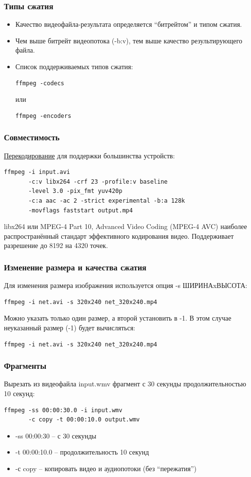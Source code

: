 \documentclass[11pt, compress]{beamer}
\renewcommand{\emph}[1]{\textcolor{dark-blue}{#1}}
\begin{document}
\begin{frame}[c,fragile]
\frametitle{Типы сжатия}
\begin{itemize}
\item Качество видеофайла-результата определяется ``битрейтом'' и типом сжатия.
\item Чем выше битрейт видеопотока (\emph{-b:v}), тем выше качество результирующего файла.
\item Список поддерживаемых типов сжатия:
\begin{lstlisting}
ffmpeg -codecs
\end{lstlisting}  
или
\begin{lstlisting}
ffmpeg -encoders
\end{lstlisting}  
\end{itemize}
\end{frame}

\begin{frame}[c,fragile]
\frametitle{Совместимость}
\href{https://superuser.com/questions/859010/what-ffmpeg-command-line-produces-video-more-compatible-across-all-devices}{Перекодирование} для поддержки большинства устройств:
\begin{lstlisting}
ffmpeg -i input.avi 
       -c:v libx264 -crf 23 -profile:v baseline 
       -level 3.0 -pix_fmt yuv420p 
       -c:a aac -ac 2 -strict experimental -b:a 128k 
       -movflags faststart output.mp4
\end{lstlisting}
\emph{libx264} или MPEG-4 Part 10, Advanced Video Coding (MPEG-4 AVC) наиболее распространённый стандарт эффективного кодирования видео. Поддерживает разрешение до 8192 на 4320 точек.
\end{frame}


\begin{frame}[c, fragile]
\frametitle{Изменение размера и качества сжатия}
Для изменения размера изображения используется опция 
\emph{-s ШИРИНАxВЫСОТА}:
\begin{lstlisting}
ffmpeg -i net.avi -s 320x240 net_320x240.mp4
\end{lstlisting}  
Можно указать только один размер, а второй установить в -1. В этом случае неуказанный размер (-1) будет  вычисляться:
\begin{lstlisting}
ffmpeg -i net.avi -s 320x240 net_320x240.mp4
\end{lstlisting}  
\end{frame}

\begin{frame}[c, fragile]
\frametitle{Фрагменты}
Вырезать из видеофайла input.wmv фрагмент с 30 секунды продолжительностью 10 секунд:
\begin{lstlisting}
ffmpeg -ss 00:00:30.0 -i input.wmv 
       -c copy -t 00:00:10.0 output.wmv
\end{lstlisting}
\begin{itemize}
\item \emph{-ss 00:00:30} -- с 30 секунды
\item \emph{-t 00:00:10.0} -- продолжительность 10 секунд
\item \emph{-с copy} -- копировать видео и аудиопотоки (без ``пережатия'')
\end{itemize}
\end{frame}
\end{document}
